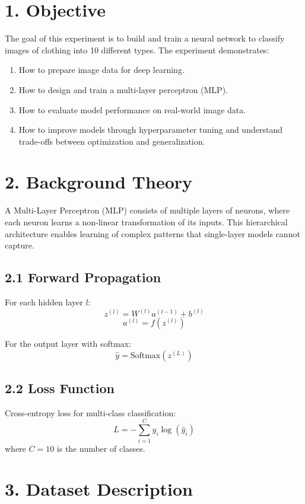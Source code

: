 \documentclass[11pt]{article}
\begin{document}
\section*{1. Objective}

The goal of this experiment is to build and train a neural network to classify images of clothing into 10 different types. The experiment demonstrates:
\begin{enumerate}[leftmargin=*]
\item How to prepare image data for deep learning.
\item How to design and train a multi-layer perceptron (MLP).
\item How to evaluate model performance on real-world image data.
\item How to improve models through hyperparameter tuning and understand trade-offs between optimization and generalization.
\end{enumerate}

\section*{2. Background Theory}

A Multi-Layer Perceptron (MLP) consists of multiple layers of neurons, where each neuron learns a non-linear transformation of its inputs. This hierarchical architecture enables learning of complex patterns that single-layer models cannot capture.

\subsection*{2.1 Forward Propagation}
For each hidden layer $l$:
\[
z^{(l)} = W^{(l)} a^{(l-1)} + b^{(l)}
\]
\[
a^{(l)} = f(z^{(l)})
\]

For the output layer with softmax:
\[
\hat{y} = \text{Softmax}(z^{(L)})
\]

\subsection*{2.2 Loss Function}
Cross-entropy loss for multi-class classification:
\[
L = -\sum_{i=1}^{C} y_i \log(\hat{y}_i)
\]
where $C=10$ is the number of classes.

\section*{3. Dataset Description}
\end{document}
